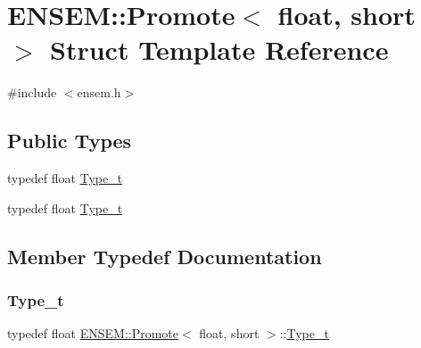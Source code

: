 \hypertarget{structENSEM_1_1Promote_3_01float_00_01short_01_4}{}\section{E\+N\+S\+EM\+:\+:Promote$<$ float, short $>$ Struct Template Reference}
\label{structENSEM_1_1Promote_3_01float_00_01short_01_4}


{\ttfamily \#include $<$ensem.\+h$>$}

\subsection*{Public Types}
\begin{DoxyCompactItemize}
\item 
typedef float \mbox{\hyperlink{structENSEM_1_1Promote_3_01float_00_01short_01_4_a353d7eb6960736f72669b0ec69c11319}{Type\+\_\+t}}
\item 
typedef float \mbox{\hyperlink{structENSEM_1_1Promote_3_01float_00_01short_01_4_a353d7eb6960736f72669b0ec69c11319}{Type\+\_\+t}}
\end{DoxyCompactItemize}


\subsection{Member Typedef Documentation}
\mbox{\label{structENSEM_1_1Promote_3_01float_00_01short_01_4_a353d7eb6960736f72669b0ec69c11319}} 
\subsubsection{\texorpdfstring{Type\_t}{Type\_t}\hspace{0.1cm}{\footnotesize\ttfamily [1/2]}}
{\footnotesize\ttfamily typedef float \mbox{\hyperlink{structENSEM_1_1Promote}{E\+N\+S\+E\+M\+::\+Promote}}$<$ float, short $>$\+::\mbox{\hyperlink{structENSEM_1_1Promote_3_01float_00_01short_01_4_a353d7eb6960736f72669b0ec69c11319}{Type\+\_\+t}}}

\mbox{\label{structENSEM_1_1Promote_3_01float_00_01short_01_4_a353d7eb6960736f72669b0ec69c11319}} 
